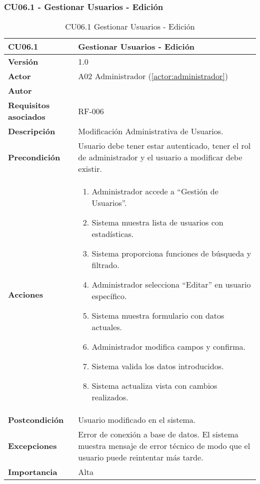 \subsubsection{CU06.1 - Gestionar Usuarios - Edición}

\begin{table}[H]
	\centering
	\begin{tabularx}{\linewidth}{ p{} p{} }
		\toprule
		\textbf{CU06.1}    & \textbf{Gestionar Usuarios - Edición} \\
		\toprule
		\textbf{Versión}              & 1.0    \\
		\textbf{Actor}                & A02 Administrador (\ref{actor:administrador}) \\
		\textbf{Autor}                & \nombre \\
		\textbf{Requisitos asociados} & RF-006 \\
		\textbf{Descripción}          & Modificación Administrativa de Usuarios. \\
		\textbf{Precondición}         & Usuario debe tener estar autenticado, tener el rol de administrador y el usuario a modificar debe existir. \\
		\textbf{Acciones}             &
		\begin{enumerate}
			\def\labelenumi{\arabic{enumi}.}
			\tightlist
			\item Administrador accede a ``Gestión de Usuarios''.
            \item Sistema muestra lista de usuarios con estadísticas.
            \item Sistema proporciona funciones de búsqueda y filtrado.
            \item Administrador selecciona ``Editar'' en usuario específico.
 	    \item Sistema muestra formulario con datos actuales.
            \item Administrador modifica campos y confirma.
            \item Sistema valida los datos introducidos.
            \item Sistema actualiza vista con cambios realizados.
		\end{enumerate}\\
		\textbf{Postcondición}        & Usuario modificado en el sistema.\\
		\textbf{Excepciones}          & Error de conexión a base de datos. El sistema muestra mensaje de error técnico de modo que el usuario puede reintentar más tarde.\\
		\textbf{Importancia}          & Alta \\
		\bottomrule
	\end{tabularx}
	\caption{CU06.1 Gestionar Usuarios - Edición}
	\label{cu:gestionar-usuarios-edicion}
\end{table}

